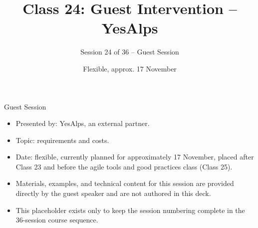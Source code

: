 

\title{Class 24: Guest Intervention -- YesAlps}
\subtitle{Session 24 of 36 -- Guest Session}
\author{\coursename}
\date{Flexible, approx. 17 November}



\frame{\titlepage \coursefooter}

\begin{frame}{Guest Session}
\begin{itemize}
\item Presented by: YesAlps, an external partner.
\item Topic: requirements and costs.
\item Date: flexible, currently planned for approximately 17 November, placed after Class 23 and before the agile tools and good practices class (Class 25).
\item Materials, examples, and technical content for this session are provided directly by the guest speaker and are not authored in this deck.
\item This placeholder exists only to keep the session numbering complete in the 36-session course sequence.
\end{itemize}
\coursefooter
\end{frame}


